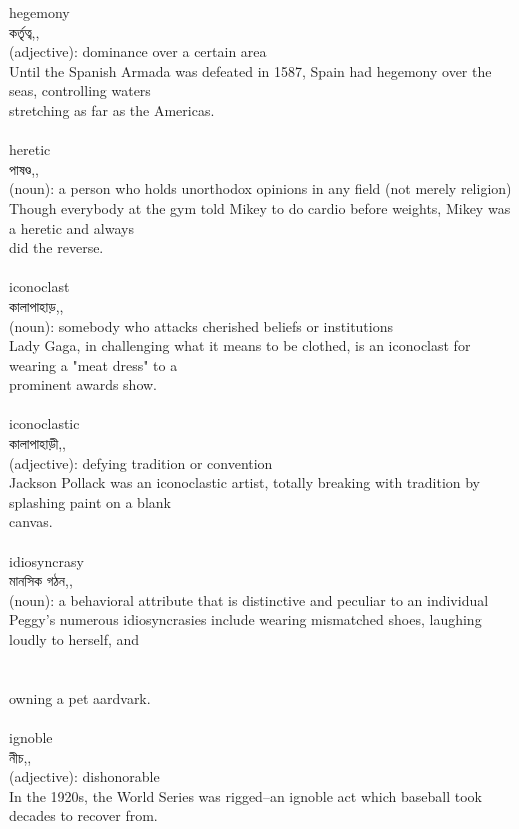 \documentclass{article}
\begin{document}
{hegemony}\\
{কর্তৃত্ব,,}\\
{(adjective): dominance over a certain area\\Until the Spanish Armada was defeated in 1587, Spain had hegemony over the seas, controlling waters\\stretching as far as the Americas.\\}\\
{heretic}\\
{পাষণ্ড,,}\\
{(noun): a person who holds unorthodox opinions in any field (not merely religion)\\Though everybody at the gym told Mikey to do cardio before weights, Mikey was a heretic and always\\did the reverse.\\}\\
{iconoclast}\\
{কালাপাহাড়,,}\\
{(noun): somebody who attacks cherished beliefs or institutions\\Lady Gaga, in challenging what it means to be clothed, is an iconoclast for wearing a "meat dress" to a\\prominent awards show.\\}\\
{iconoclastic}\\
{কালাপাহাড়ী,,}\\
{(adjective): defying tradition or convention\\Jackson Pollack was an iconoclastic artist, totally breaking with tradition by splashing paint on a blank\\canvas.\\}\\
{idiosyncrasy}\\
{মানসিক গঠন,,}\\
{(noun): a behavioral attribute that is distinctive and peculiar to an individual\\Peggy's numerous idiosyncrasies include wearing mismatched shoes, laughing loudly to herself, and\\\\                                                                                \\owning a pet aardvark.\\}\\
{ignoble}\\
{নীচ,,}\\
{(adjective): dishonorable\\In the 1920s, the World Series was rigged--an ignoble act which baseball took decades to recover from.\\}\\
\end{document}
